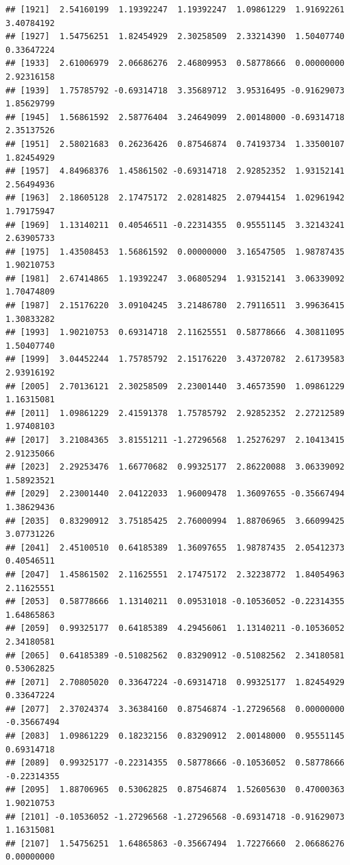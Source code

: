 \documentclass[
]{article}
\begin{document}
\begin{verbatim}
## [1921]  2.54160199  1.19392247  1.19392247  1.09861229  1.91692261  3.40784192
## [1927]  1.54756251  1.82454929  2.30258509  2.33214390  1.50407740  0.33647224
## [1933]  2.61006979  2.06686276  2.46809953  0.58778666  0.00000000  2.92316158
## [1939]  1.75785792 -0.69314718  3.35689712  3.95316495 -0.91629073  1.85629799
## [1945]  1.56861592  2.58776404  3.24649099  2.00148000 -0.69314718  2.35137526
## [1951]  2.58021683  0.26236426  0.87546874  0.74193734  1.33500107  1.82454929
## [1957]  4.84968376  1.45861502 -0.69314718  2.92852352  1.93152141  2.56494936
## [1963]  2.18605128  2.17475172  2.02814825  2.07944154  1.02961942  1.79175947
## [1969]  1.13140211  0.40546511 -0.22314355  0.95551145  3.32143241  2.63905733
## [1975]  1.43508453  1.56861592  0.00000000  3.16547505  1.98787435  1.90210753
## [1981]  2.67414865  1.19392247  3.06805294  1.93152141  3.06339092  1.70474809
## [1987]  2.15176220  3.09104245  3.21486780  2.79116511  3.99636415  1.30833282
## [1993]  1.90210753  0.69314718  2.11625551  0.58778666  4.30811095  1.50407740
## [1999]  3.04452244  1.75785792  2.15176220  3.43720782  2.61739583  2.93916192
## [2005]  2.70136121  2.30258509  2.23001440  3.46573590  1.09861229  1.16315081
## [2011]  1.09861229  2.41591378  1.75785792  2.92852352  2.27212589  1.97408103
## [2017]  3.21084365  3.81551211 -1.27296568  1.25276297  2.10413415  2.91235066
## [2023]  2.29253476  1.66770682  0.99325177  2.86220088  3.06339092  1.58923521
## [2029]  2.23001440  2.04122033  1.96009478  1.36097655 -0.35667494  1.38629436
## [2035]  0.83290912  3.75185425  2.76000994  1.88706965  3.66099425  3.07731226
## [2041]  2.45100510  0.64185389  1.36097655  1.98787435  2.05412373  0.40546511
## [2047]  1.45861502  2.11625551  2.17475172  2.32238772  1.84054963  2.11625551
## [2053]  0.58778666  1.13140211  0.09531018 -0.10536052 -0.22314355  1.64865863
## [2059]  0.99325177  0.64185389  4.29456061  1.13140211 -0.10536052  2.34180581
## [2065]  0.64185389 -0.51082562  0.83290912 -0.51082562  2.34180581  0.53062825
## [2071]  2.70805020  0.33647224 -0.69314718  0.99325177  1.82454929  0.33647224
## [2077]  2.37024374  3.36384160  0.87546874 -1.27296568  0.00000000 -0.35667494
## [2083]  1.09861229  0.18232156  0.83290912  2.00148000  0.95551145  0.69314718
## [2089]  0.99325177 -0.22314355  0.58778666 -0.10536052  0.58778666 -0.22314355
## [2095]  1.88706965  0.53062825  0.87546874  1.52605630  0.47000363  1.90210753
## [2101] -0.10536052 -1.27296568 -1.27296568 -0.69314718 -0.91629073  1.16315081
## [2107]  1.54756251  1.64865863 -0.35667494  1.72276660  2.06686276  0.00000000

\end{verbatim}
\end{document}
